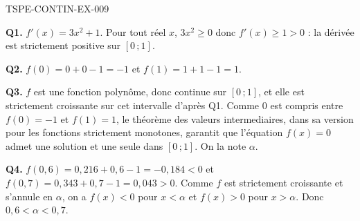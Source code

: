 \begin{corrige}{TSPE-CONTIN-EX-009}

\textbf{Q1.} $f'(x) = 3x^2 + 1$. Pour tout réel $x$, $3x^2 \geq 0$ donc $f'(x) \geq 1 > 0$ : la dérivée est strictement positive sur $[0\,;1]$.

\textbf{Q2.} $f(0) = 0 + 0 - 1 = -1$ et $f(1) = 1 + 1 - 1 = 1$.

\textbf{Q3.} $f$ est une fonction polynôme, donc continue sur $[0\,;1]$, et elle est strictement croissante sur cet intervalle d'après Q1. Comme $0$ est compris entre $f(0) = -1$ et $f(1) = 1$, le théorème des valeurs intermediaires, dans sa version pour les fonctions strictement monotones, garantit que l'équation $f(x) = 0$ admet une solution et une seule dans $[0\,;1]$. On la note $\alpha$.

\textbf{Q4.} $f(0{,}6) = 0{,}216 + 0{,}6 - 1 = -0{,}184 < 0$ et $f(0{,}7) = 0{,}343 + 0{,}7 - 1 = 0{,}043 > 0$. Comme $f$ est strictement croissante et s'annule en $\alpha$, on a $f(x) < 0$ pour $x < \alpha$ et $f(x) > 0$ pour $x > \alpha$. Donc $0{,}6 < \alpha < 0{,}7$.
\end{corrige}
